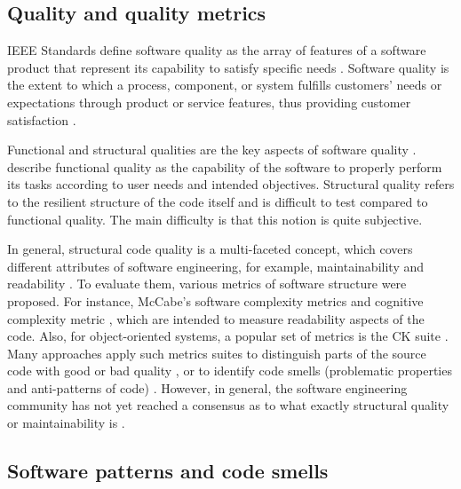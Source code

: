
\subsection{Quality and quality metrics}
IEEE Standards define software quality as the array of features of
a software product that represent its capability to satisfy
specific needs \citep{Youness2013ComparativeSO}.
Software quality  is the extent to which  a  process,
component,  or  system fulfills customers' needs  or expectations
through product or service features, thus providing customer
satisfaction \citep{Iacob_Constantinescu}.

Functional and  structural qualities are the key  aspects  of  software
quality  \citep{Liu2006AnIE}.  \citet{Farhan} describe
functional  quality  as  the capability  of  the  software
to  properly  perform  its  tasks according  to  user  needs  and
intended  objectives.  Structural quality refers to
the resilient structure of the code itself and is difficult to test
compared to functional quality. The main difficulty is that this
notion is quite subjective.

In general, structural code quality is a multi-faceted concept, which covers
different  attributes of software engineering, for example, maintainability  and
readability \citep{Mohammadi2013AnAO}. To evaluate them, various metrics of
software structure were proposed. For instance, McCabe's software complexity
metrics \citep{McCabe1976ACM} and cognitive complexity metric
\citep{Cognitive}, which are intended to measure readability aspects of the
code. Also, for object-oriented systems, a popular  set of metrics is the CK
suite \citep{Chidamber1994AMS}. Many approaches apply such metrics suites to
distinguish parts of the source code with good  or bad quality
\citet{Fil2015ACO}, \citet{Shatnawi2010FindingSM}  or to identify code smells
(problematic properties and anti-patterns  of code)
\citet{Ouni2011MaintainabilityDD}. However, in general, the software engineering
community has not yet reached a consensus as to what exactly structural quality
or maintainability is \citep{Broy2006DemystifyingM}.


\subsection{Software patterns and code smells}

